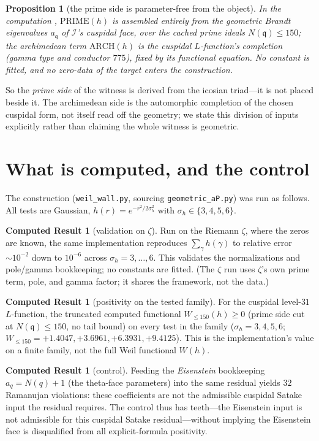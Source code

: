 \documentclass[11pt]{article}
\newtheorem{proposition}[theorem]{Proposition}
\theoremstyle{definition}
\newtheorem{result}[theorem]{Computed Result}
\newcommand{\Icos}{\mathcal{I}}
\newcommand{\fq}{\mathfrak{q}}
\newcommand{\Wtrunc}{W_{\le 150}}
\begin{document}
\begin{proposition}[the prime side is parameter-free from the object]\label{prop:witness}
In the computation \cite{BrandtCuspidal}, $\mathrm{PRIME}(h)$ is assembled entirely from
the geometric Brandt eigenvalues $a_\fq$ of $\Icos$'s cuspidal face, over the cached
prime ideals $N(\fq)\le 150$; the archimedean term $\mathrm{ARCH}(h)$ is the cuspidal
$L$-function's completion (gamma type and conductor $775$), fixed by its functional
equation. No constant is fitted, and no zero-data of the target enters the construction.
\end{proposition}

So the \emph{prime side} of the witness is derived from the icosian triad---it is not
placed beside it. The archimedean side is the automorphic completion of the chosen
cuspidal form, not itself read off the geometry; we state this division of inputs
explicitly rather than claiming the whole witness is geometric.

\section{What is computed, and the control}
The construction (\texttt{weil\_wall.py}, sourcing \texttt{geometric\_aP.py}) was run as
follows. All tests are Gaussian, $h(r)=e^{-r^2/2\sigma_h^2}$ with $\sigma_h\in\{3,4,5,6\}$.

\begin{result}[validation on $\zeta$]\label{res:gate}
Run on the Riemann $\zeta$, where the zeros are known, the same implementation reproduces
$\sum_\gamma h(\gamma)$ to relative error $\sim10^{-2}$ down to $10^{-6}$ across
$\sigma_h=3,\dots,6$. This validates the normalizations and pole/gamma bookkeeping; no
constants are fitted. (The $\zeta$ run uses $\zeta$'s own prime term, pole, and gamma
factor; it shares the framework, not the data.)
\end{result}

\begin{result}[positivity on the tested family]\label{res:pos}
For the cuspidal level-$31$ $L$-function, the truncated computed functional
$\Wtrunc(h)\ge 0$ (prime side cut at $N(\fq)\le150$, no tail bound) on every test in the
family ($\sigma_h=3,4,5,6$; $\Wtrunc=+1.4047,+3.6961,+6.3931,+9.4125$). This is the
implementation's value on a finite family, not the full Weil functional $W(h)$.
\end{result}

\begin{result}[control]\label{res:ctrl}
Feeding the \emph{Eisenstein} bookkeeping $a_q=N(q)+1$ (the theta-face parameters) into
the same residual yields $32$ Ramanujan violations: these coefficients are not the
admissible cuspidal Satake input the residual requires. The control thus has teeth---the
Eisenstein input is not admissible for this cuspidal Satake residual---without implying
the Eisenstein face is disqualified from all explicit-formula positivity.
\end{result}
\end{document}
